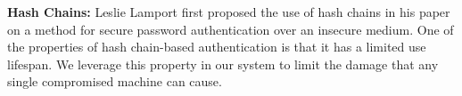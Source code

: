 \documentclass[a4paper,twoside]{article}
\begin{document}
%
%
%
%
%
% 
% 
% 
% 
%
\textbf{Hash Chains:}  Leslie Lamport \cite{lamport_password_1981} first proposed the use of hash chains in his paper on a method for secure password authentication over an insecure medium.  One of the properties of hash chain-based authentication is that it has a limited use lifespan.  We leverage this property in our system to limit the damage that any single compromised machine can cause.
\end{document}
